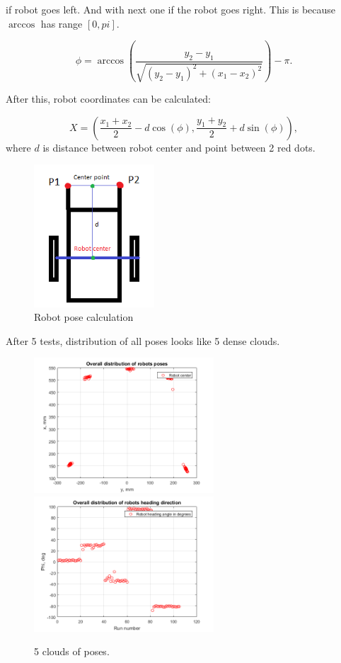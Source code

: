 \documentclass[a4paper, 12pt]{article}
\begin{document}
if robot goes left. And with next one if the robot goes right. This is because $\arccos$ has range $[0, pi]$.

\begin{equation}
\phi = \arccos(\frac{y_2-y_1}{\sqrt{(y_2-y_1)^2+(x_1-x_2)^2}})-\pi.
\end{equation}

After this, robot coordinates can be calculated:

\begin{equation}
X = (\frac{x_1+x_2}{2}-d \cos(\phi),\frac{y_1+y_2}{2}+d \sin(\phi)),
\end{equation}
where $d$ is distance between robot center and point between 2 red dots.

\begin{figure}[h]
  \centering
  \caption{Robot pose calculation\label{fig:frame}}
  \includegraphics[width=0.4\textwidth]{pose}
\end{figure}
\newpage


After 5 tests, distribution of all poses looks like 5 dense clouds. 


\begin{figure}[h]
  \centering
  \caption{5 clouds of poses.\label{fig:clouds}}
  \includegraphics[width=0.6\textwidth]{all}
  \includegraphics[width=0.6\textwidth]{allphi}
\end{figure}
\end{document}
